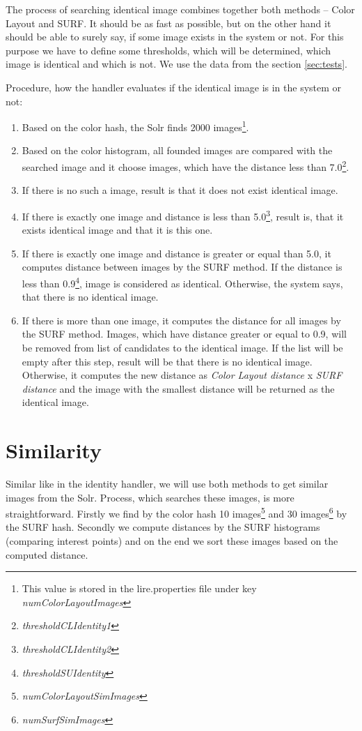 \documentclass[12pt,a4paper]{report}
\begin{document}
The process of searching identical image combines together both methods -- Color Layout and SURF. It should be as fast as possible, but on the other hand it should be able to surely say, if some image exists in the system or not. For this purpose we have to define some thresholds, which will be determined, which image is identical and which is not. We use the data from the section \ref{sec:tests}.

Procedure, how the handler evaluates if the identical image is in the system or not:

\begin{enumerate}
\item Based on the color hash, the Solr finds 2000 images\footnote{This value is stored in the lire.properties file under key \textit{numColorLayoutImages}}.
\item Based on the color histogram, all founded images are compared with the searched image and it choose images, which have the distance less than 7.0\footnote{\textit{thresholdCLIdentity1}}.
\item If there is no such a image, result is that it does not exist identical image.
\item If there is exactly one image and distance is less than 5.0\footnote{\textit{thresholdCLIdentity2}}, result is, that it exists identical image and that it is this one.
\item If there is exactly one image and distance is greater or equal than 5.0, it computes distance between images by the SURF method. If the distance is less than 0.9\footnote{\textit{thresholdSUIdentity}}, image is considered as identical. Otherwise, the system says, that there is no identical image.
\item If there is more than one image, it computes the distance for all images by the SURF method. Images, which have distance greater or equal to 0.9, will be removed from list of candidates to the identical image. If the list will be empty after this step, result will be that there is no identical image. Otherwise, it computes the new distance as \textit{Color Layout distance} x \textit{SURF distance} and the image with the smallest distance will be returned as the identical image.
\end{enumerate}

\section{Similarity}

Similar like in the identity handler, we will use both methods to get similar images from the Solr. Process, which searches these images, is more straightforward. Firstly we find by the color hash 10 images\footnote{\textit{numColorLayoutSimImages}} and 30 images\footnote{\textit{numSurfSimImages}} by the SURF hash. Secondly we compute distances by the SURF histograms (comparing interest points) and on the end we sort these images based on the computed distance.

\printbibliography
\end{document}

